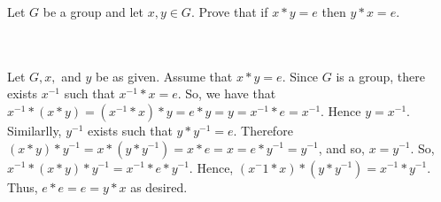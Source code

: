 Let $G$ be a group and let $x,y\in G$. Prove that if $x*y=e$ then $y*x=e$.\\\\

\begin{solution}\renewcommand{\qedsymbol}{}\ \\
    Let $G, x,$ and $y$ be as given. Assume that $x*y=e$. Since $G$ is a group, there exists $x^{-1}$
    such that $x^{-1}*x=e$. So, we have that $x^{-1}*(x*y)=(x^{-1}*x)*y=e*y=y=x^{-1}*e=x^{-1}$. Hence
    $y=x^{-1}$. Similarlly, $y^{-1}$ exists such that $y*y^{-1}=e$. Therefore
    $(x*y)*y^{-1}=x*(y*y^{-1})=x*e=x=e*y^{-1}=y^{-1}$, and so, $x=y^{-1}$. So,
    $x^{-1}*(x*y)*y^{-1}=x^{-1}*e*y^{-1}$. Hence, $(x^-1*x)*(y*y^{-1})=x^{-1}*y^{-1}$. Thus,
    $e*e=e=y*x$ as desired.

\end{solution}